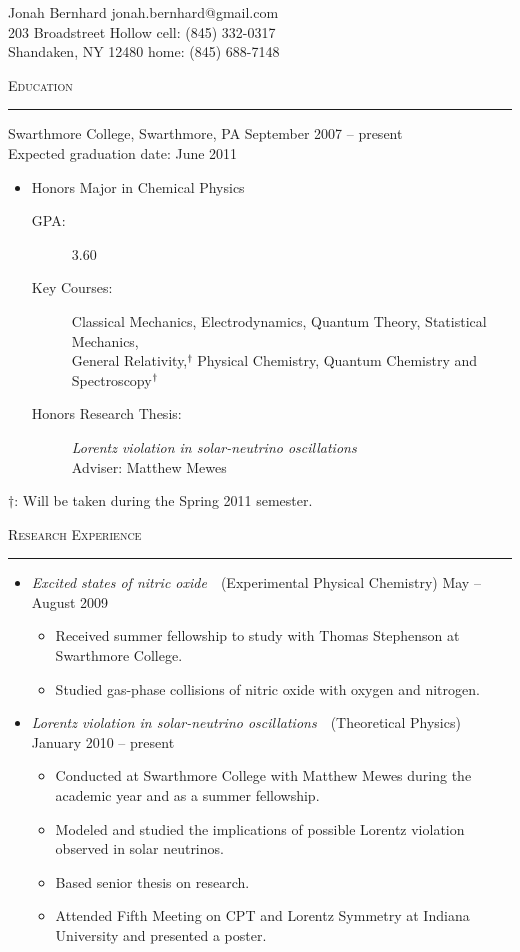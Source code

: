 \documentclass[letterpaper,10pt]{article}
\newcommand{\heading}[1]{\medskip\bigskip \textsc{#1} \medskip \hrule \smallskip}
\newcommand{\notyet}{$^{\dagger\hspace{2px}}$}
\begin{document}
\Large{Jonah Bernhard} \hfill \normalsize{jonah.bernhard@gmail.com} \\[4pt]
203 Broadstreet Hollow \hfill cell: (845) 332-0317 \\
Shandaken, NY 12480 \hfill home: (845) 688-7148

\medskip

\heading{Education}
\medskip
Swarthmore College, Swarthmore, PA \hfill September 2007 -- present \\[2pt]
Expected graduation date:  June 2011
\begin{itemize}
  \item Honors Major in Chemical Physics
    \begin{description}
      \item[GPA:] 3.60
      \item[Key Courses:]  Classical Mechanics, Electrodynamics, Quantum Theory, Statistical Mechanics, \\ General Relativity,\notyet Physical Chemistry, 
        Quantum Chemistry and Spectroscopy\notyet
      \item[Honors Research Thesis:]  {\em Lorentz violation in solar-neutrino oscillations} \\
        Adviser:  Matthew Mewes
    \end{description}
\end{itemize}
\footnotesize{$\dagger$: Will be taken during the Spring 2011 semester.} \normalsize

\smallskip\smallskip

\heading{Research Experience}
\begin{itemize}
  \item {\em Excited states of nitric oxide}\ \ (Experimental Physical Chemistry) \hfill May -- August 2009
    \begin{itemize}
      \item Received summer fellowship to study with Thomas Stephenson at Swarthmore College.
      \item Studied gas-phase collisions of nitric oxide with oxygen and nitrogen.
    \end{itemize}

  \item {\em Lorentz violation in solar-neutrino oscillations}\ \ (Theoretical Physics) \hfill January 2010 -- present
    \begin{itemize}
      \item Conducted at Swarthmore College with Matthew Mewes during the academic year and as a summer fellowship.
      \item Modeled and studied the implications of possible Lorentz violation observed in solar neutrinos.
      \item Based senior thesis on research.
      \item Attended Fifth Meeting on CPT and Lorentz Symmetry at Indiana University and presented a poster.
    \end{itemize}
\end{itemize}
\end{document}

